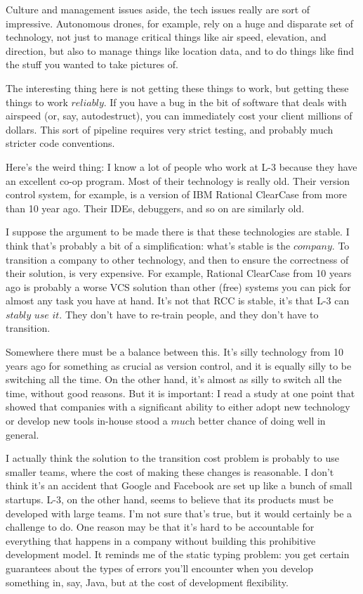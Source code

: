 \documentclass[a4paper]{article}
\begin{document}
Culture and management issues aside, the tech issues really are sort of impressive. Autonomous drones, for example, rely on a huge and disparate set of technology, not just to manage critical things like air speed, elevation, and direction, but also to manage things like location data, and to do things like find the stuff you wanted to take pictures of.

The interesting thing here is not getting these things to work, but getting these things to work $\textit{reliably}$. If you have a bug in the bit of software that deals with airspeed (or, say, autodestruct), you can immediately cost your client millions of dollars. This sort of pipeline requires very strict testing, and probably much stricter code conventions.

Here's the weird thing: I know a lot of people who work at L-3 because they have an excellent co-op program. Most of their technology is really old. Their version control system, for example, is a version of IBM Rational ClearCase from more than 10 year ago. Their IDEs, debuggers, and so on are similarly old.

I suppose the argument to be made there is that these technologies are stable. I think that's probably a bit of a simplification: what's stable is the $\textit{company}$. To transition a company to other technology, and then to ensure the correctness of their solution, is very expensive. For example, Rational ClearCase from 10 years ago is probably a worse VCS solution than other (free) systems you can pick for almost any task you have at hand. It's not that RCC is stable, it's that L-3 can $\textit{stably use it}$. They don't have to re-train people, and they don't have to transition.

Somewhere there must be a balance between this. It's silly technology from 10 years ago for something as crucial as version control, and it is equally silly to be switching all the time. On the other hand, it's almost as silly to switch all the time, without good reasons. But it is important: I read a study at one point that showed that companies with a significant ability to either adopt new technology or develop new tools in-house stood a $\textit{much}$ better chance of doing well in general.

I actually think the solution to the transition cost problem is probably to use smaller teams, where the cost of making these changes is reasonable. I don't think it's an accident that Google and Facebook are set up like a bunch of small startups. L-3, on the other hand, seems to believe that its products must be developed with large teams. I'm not sure that's true, but it would certainly be a challenge to do. One reason may be that it's hard to be accountable for everything that happens in a company without building this prohibitive development model. It reminds me of the static typing problem: you get certain guarantees about the types of errors you'll encounter when you develop something in, say, Java, but at the cost of development flexibility.
\end{document}
